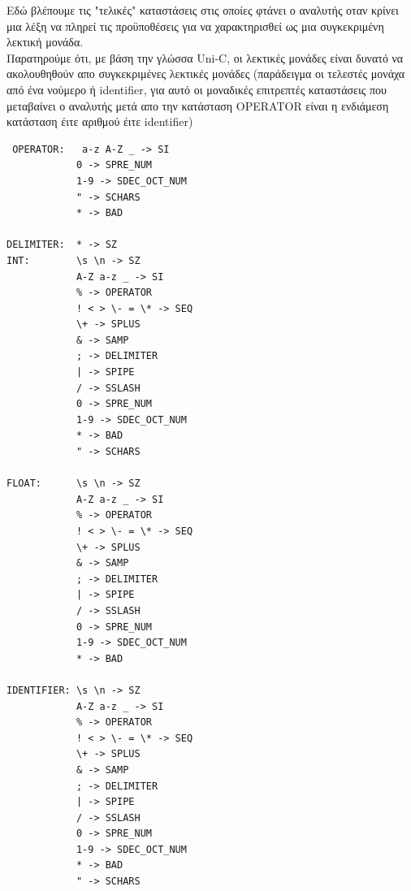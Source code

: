 \documentclass[14pt]{extarticle}
\begin{document}
Εδώ βλέπουμε τις "τελικές" καταστάσεις στις οποίες φτάνει ο αναλυτής οταν κρίνει μια λέξη να πληρεί τις προϋποθέσεις για να χαρακτηρισθεί ως μια συγκεκριμένη λεκτική μονάδα.
\\
Παρατηρούμε ότι, με βάση την γλώσσα \textlatin{Uni-C}, οι λεκτικές μονάδες είναι δυνατό να ακολουθηθούν απο συγκεκριμένες λεκτικές μονάδες (παράδειγμα οι τελεστές μονάχα από ένα νούμερο ή \textlatin{identifier}, για αυτό οι μοναδικές επιτρεπτές καταστάσεις που μεταβαίνει ο αναλυτής μετά απο την κατάσταση \textlatin{OPERATOR} είναι η ενδιάμεση κατάσταση έιτε αριθμού έιτε \textlatin{identifier}) 
    \begin{lstlisting}
 OPERATOR:   a-z A-Z _ -> SI
            0 -> SPRE_NUM
            1-9 -> SDEC_OCT_NUM    
            " -> SCHARS
            * -> BAD

DELIMITER:  * -> SZ
INT:        \s \n -> SZ
            A-Z a-z _ -> SI
            % -> OPERATOR
            ! < > \- = \* -> SEQ
            \+ -> SPLUS
            & -> SAMP
            ; -> DELIMITER
            | -> SPIPE
            / -> SSLASH
            0 -> SPRE_NUM
            1-9 -> SDEC_OCT_NUM
            * -> BAD
            " -> SCHARS

FLOAT:      \s \n -> SZ
            A-Z a-z _ -> SI
            % -> OPERATOR
            ! < > \- = \* -> SEQ
            \+ -> SPLUS
            & -> SAMP
            ; -> DELIMITER
            | -> SPIPE
            / -> SSLASH
            0 -> SPRE_NUM
            1-9 -> SDEC_OCT_NUM
            * -> BAD
    
IDENTIFIER: \s \n -> SZ
            A-Z a-z _ -> SI
            % -> OPERATOR
            ! < > \- = \* -> SEQ
            \+ -> SPLUS
            & -> SAMP
            ; -> DELIMITER
            | -> SPIPE
            / -> SSLASH
            0 -> SPRE_NUM
            1-9 -> SDEC_OCT_NUM
            * -> BAD
            " -> SCHARS


    \end{lstlisting}
\end{document}
